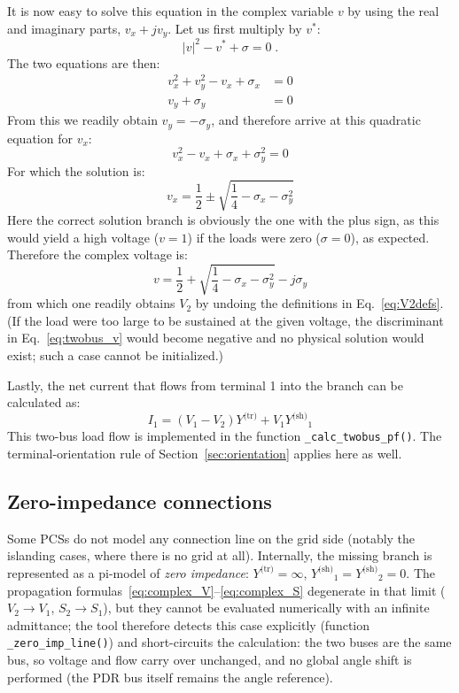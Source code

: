 \documentclass[a4paper,11pt]{article}
\newcommand{\code}[1]{\texttt{#1}}  %
\providecommand{\abs}[1]{\lvert#1\rvert}
\newcommand{\Ytr}{\ensuremath{Y^{\textrm{(tr)}}}}
\newcommand{\Ysh}{\ensuremath{Y^{\textrm{(sh)}}}}
\begin{document}
It is now easy to solve this equation in the complex variable $v$ by using the
real and imaginary parts, $v_x + j v_y$. Let us first multiply by $v^*$:
\begin{equation*}
  \abs{v}^2 - v^* + \sigma = 0 \;.
\end{equation*}
The two equations are then:
\begin{align*}
  v_x^2 + v_y^2 - v_x + \sigma_x  & = 0 \\
  v_y + \sigma_y  & = 0
\end{align*}
From this we readily obtain $v_y = -\sigma_y$, and therefore arrive at this
quadratic equation for $v_x$:
\begin{equation*}
  v_x^2 - v_x + \sigma_x  + \sigma_y^2 = 0
\end{equation*}
For which the solution is:
\begin{equation*}
  v_x = \frac{1}{2} \pm \sqrt{\frac{1}{4} - \sigma_x - \sigma_y^2}
\end{equation*}
Here the correct solution branch is obviously the one with the plus sign, as this would
yield a high voltage ($v=1$) if the loads were zero ($\sigma=0$), as expected. Therefore
the complex voltage is:
\begin{equation}
  v = \frac{1}{2} + \sqrt{\frac{1}{4} - \sigma_x - \sigma_y^2} - j \sigma_y
  \label{eq:twobus_v}
\end{equation}
from which one readily obtains $V_2$ by undoing the definitions in
Eq.~\eqref{eq:V2defs}. (If the load were too large to be sustained at the given voltage,
the discriminant in Eq.~\eqref{eq:twobus_v} would become negative and no physical
solution would exist; such a case cannot be initialized.)

Lastly, the net current that flows from terminal 1 into the branch can be
calculated as:
\begin{equation}
  I_1 = (V_1 - V_2) \Ytr + V_1 \Ysh_1
  \label{eq:twobus_I1}
\end{equation}
This two-bus load flow is implemented in the function \code{\_calc\_twobus\_pf()}. The
terminal-orientation rule of Section~\ref{sec:orientation} applies here as well.


\subsection{Zero-impedance connections}
\label{sec:zeroimp}

Some PCSs do not model any connection line on the grid side (notably the islanding
cases, where there is no grid at all). Internally, the missing branch is represented as
a pi-model of \emph{zero impedance}: $\Ytr = \infty$, $\Ysh_1 = \Ysh_2 = 0$. The
propagation formulas~\eqref{eq:complex_V}--\eqref{eq:complex_S} degenerate in that limit
($V_2 \to V_1$, $S_2 \to S_1$), but they cannot be evaluated numerically with an
infinite admittance; the tool therefore detects this case explicitly (function
\code{\_zero\_imp\_line()}) and short-circuits the calculation: the two buses are the
same bus, so voltage and flow carry over unchanged, and no global angle shift is
performed (the PDR bus itself remains the angle reference).
\end{document}
